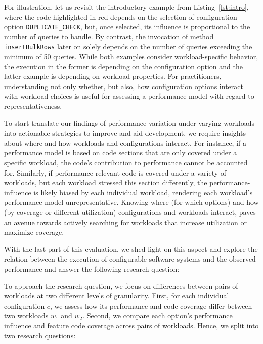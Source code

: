 For illustration, let us revisit the introductory example from Listing~\ref{lst:intro}, where the code highlighted in\label{sec:rq3} red depends on the selection of configuration option \texttt{DUPLICATE\_CHECK}, but, once selected, its influence is proportional to the number of queries to handle. By contrast, the invocation of method \texttt{insertBulkRows} later on solely depends on the number of queries exceeding the minimum of 50 queries. While both examples consider workload-specific behavior, the execution in the former is depending on the configuration option and the latter example is depending on workload properties. 
For practitioners, understanding not only whether, but also, how configuration options interact with workload choices is useful for assessing a performance model with regard to representativeness. 

To start translate our findings of performance variation under varying workloads into actionable strategies to improve and aid development, we require insights about where and how workloads and configurations interact. For instance, if a performance model is based on code sections that are only covered under a specific workload, the code’s contribution to performance cannot be accounted for. Similarly, if performance-relevant code is covered under a variety of workloads, but each workload stressed this section differently, the performance-influence is likely biased by each individual workload, rendering each workload's performance model unrepresentative. Knowing where (for which options) and how (by coverage or different utilization) configurations and workloads interact, paves an avenue towards actively searching for workloads that increase utilization or maximize coverage.

With the last part of this evaluation, we shed light on this aspect and explore the relation between the execution of configurable software systems and the observed performance and answer the following research question:


To approach the research question, we focus on differences between pairs of workloads at two different levels of granularity. First, for each individual configuration $c$, we assess  how its performance and code coverage differ between two workloads $w_1$ and $w_2$. Second, we compare each option's performance influence and feature code coverage across pairs of workloads. Hence, we split  into two research questions:

